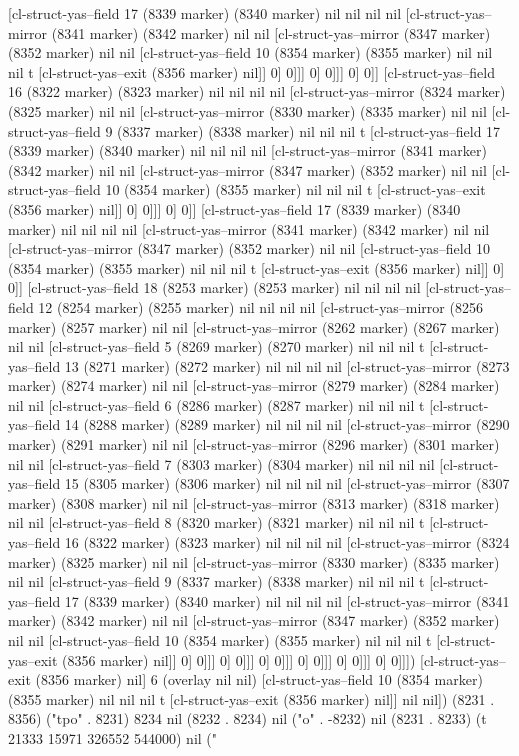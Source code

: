 {{[cl-struct-yas--field 17 (8339 marker) (8340 marker) nil nil nil nil [cl-struct-yas--mirror (8341 marker) (8342 marker) nil nil [cl-struct-yas--mirror (8347 marker) (8352 marker) nil nil [cl-struct-yas--field 10 (8354 marker) (8355 marker) nil nil nil t [cl-struct-yas--exit (8356 marker) nil]] 0] 0]]] 0] 0]]] 0] 0]] [cl-struct-yas--field 16 (8322 marker) (8323 marker) nil nil nil nil [cl-struct-yas--mirror (8324 marker) (8325 marker) nil nil [cl-struct-yas--mirror (8330 marker) (8335 marker) nil nil [cl-struct-yas--field 9 (8337 marker) (8338 marker) nil nil nil t [cl-struct-yas--field 17 (8339 marker) (8340 marker) nil nil nil nil [cl-struct-yas--mirror (8341 marker) (8342 marker) nil nil [cl-struct-yas--mirror (8347 marker) (8352 marker) nil nil [cl-struct-yas--field 10 (8354 marker) (8355 marker) nil nil nil t [cl-struct-yas--exit (8356 marker) nil]] 0] 0]]] 0] 0]] [cl-struct-yas--field 17 (8339 marker) (8340 marker) nil nil nil nil [cl-struct-yas--mirror (8341 marker) (8342 marker) nil nil [cl-struct-yas--mirror (8347 marker) (8352 marker) nil nil [cl-struct-yas--field 10 (8354 marker) (8355 marker) nil nil nil t [cl-struct-yas--exit (8356 marker) nil]] 0] 0]] [cl-struct-yas--field 18 (8253 marker) (8253 marker) nil nil nil nil [cl-struct-yas--field 12 (8254 marker) (8255 marker) nil nil nil nil [cl-struct-yas--mirror (8256 marker) (8257 marker) nil nil [cl-struct-yas--mirror (8262 marker) (8267 marker) nil nil [cl-struct-yas--field 5 (8269 marker) (8270 marker) nil nil nil t [cl-struct-yas--field 13 (8271 marker) (8272 marker) nil nil nil nil [cl-struct-yas--mirror (8273 marker) (8274 marker) nil nil [cl-struct-yas--mirror (8279 marker) (8284 marker) nil nil [cl-struct-yas--field 6 (8286 marker) (8287 marker) nil nil nil t [cl-struct-yas--field 14 (8288 marker) (8289 marker) nil nil nil nil [cl-struct-yas--mirror (8290 marker) (8291 marker) nil nil [cl-struct-yas--mirror (8296 marker) (8301 marker) nil nil [cl-struct-yas--field 7 (8303 marker) (8304 marker) nil nil nil nil [cl-struct-yas--field 15 (8305 marker) (8306 marker) nil nil nil nil [cl-struct-yas--mirror (8307 marker) (8308 marker) nil nil [cl-struct-yas--mirror (8313 marker) (8318 marker) nil nil [cl-struct-yas--field 8 (8320 marker) (8321 marker) nil nil nil t [cl-struct-yas--field 16 (8322 marker) (8323 marker) nil nil nil nil [cl-struct-yas--mirror (8324 marker) (8325 marker) nil nil [cl-struct-yas--mirror (8330 marker) (8335 marker) nil nil [cl-struct-yas--field 9 (8337 marker) (8338 marker) nil nil nil t [cl-struct-yas--field 17 (8339 marker) (8340 marker) nil nil nil nil [cl-struct-yas--mirror (8341 marker) (8342 marker) nil nil [cl-struct-yas--mirror (8347 marker) (8352 marker) nil nil [cl-struct-yas--field 10 (8354 marker) (8355 marker) nil nil nil t [cl-struct-yas--exit (8356 marker) nil]] 0] 0]]] 0] 0]]] 0] 0]]] 0] 0]]] 0] 0]]] 0] 0]]]) [cl-struct-yas--exit (8356 marker) nil] 6 (overlay nil nil) [cl-struct-yas--field 10 (8354 marker) (8355 marker) nil nil nil t [cl-struct-yas--exit (8356 marker) nil]] nil nil]) (8231 . 8356) ("tpo" . 8231) 8234 nil (8232 . 8234) nil ("o" . -8232) nil (8231 . 8233) (t 21333 15971 326552 544000) nil ("
}}
